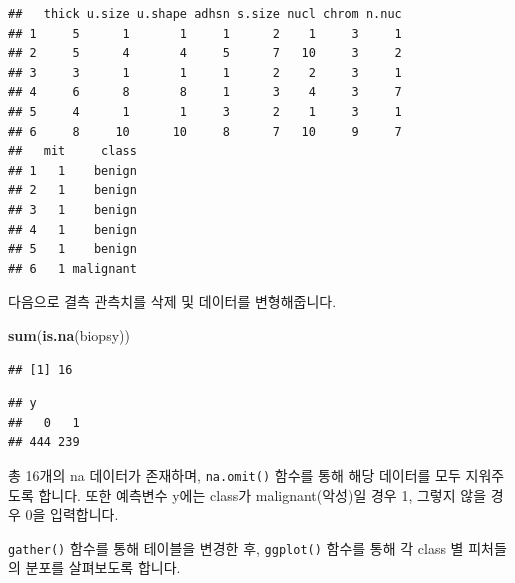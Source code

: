 \documentclass[12pt,]{book}
\newenvironment{Shaded}{\begin{snugshade}}{\end{snugshade}}
\newcommand{\DecValTok}[1]{\textcolor[rgb]{0.00,0.00,0.81}{#1}}
\newcommand{\KeywordTok}[1]{\textcolor[rgb]{0.13,0.29,0.53}{\textbf{#1}}}
\newcommand{\NormalTok}[1]{#1}
\newcommand{\OperatorTok}[1]{\textcolor[rgb]{0.81,0.36,0.00}{\textbf{#1}}}
\newcommand{\StringTok}[1]{\textcolor[rgb]{0.31,0.60,0.02}{#1}}
\begin{document}
\begin{verbatim}
##   thick u.size u.shape adhsn s.size nucl chrom n.nuc
## 1     5      1       1     1      2    1     3     1
## 2     5      4       4     5      7   10     3     2
## 3     3      1       1     1      2    2     3     1
## 4     6      8       8     1      3    4     3     7
## 5     4      1       1     3      2    1     3     1
## 6     8     10      10     8      7   10     9     7
##   mit     class
## 1   1    benign
## 2   1    benign
## 3   1    benign
## 4   1    benign
## 5   1    benign
## 6   1 malignant
\end{verbatim}

다음으로 결측 관측치를 삭제 및 데이터를 변형해줍니다.

\begin{Shaded}
\begin{Highlighting}[]
\KeywordTok{sum}\NormalTok{(}\KeywordTok{is.na}\NormalTok{(biopsy))}
\end{Highlighting}
\end{Shaded}

\begin{verbatim}
## [1] 16
\end{verbatim}

\begin{Shaded}
\end{Shaded}

\begin{verbatim}
## y
##   0   1 
## 444 239
\end{verbatim}

총 16개의 na 데이터가 존재하며, \texttt{na.omit()} 함수를 통해 해당 데이터를 모두 지워주도록 합니다. 또한 예측변수 y에는 class가 malignant(악성)일 경우 1, 그렇지 않을 경우 0을 입력합니다.

\texttt{gather()} 함수를 통해 테이블을 변경한 후, \texttt{ggplot()} 함수를 통해 각 class 별 피처들의 분포를 살펴보도록 합니다.
\end{document}
